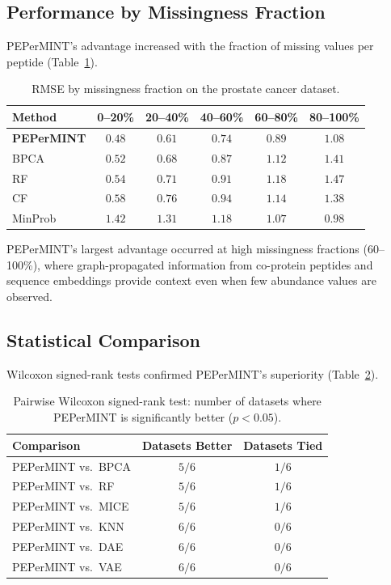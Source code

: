 \documentclass[11pt]{article}
\begin{document}
\subsection{Performance by Missingness Fraction}

PEPerMINT's advantage increased with the fraction of missing values per peptide (Table~\ref{tab:missingness}).

\begin{table}[H]
\centering
\caption{RMSE by missingness fraction on the prostate cancer dataset.}
\label{tab:missingness}
\begin{tabular}{@{}lccccc@{}}
\toprule
Method & 0--20\% & 20--40\% & 40--60\% & 60--80\% & 80--100\% \\
\midrule
\textbf{PEPerMINT} & $\mathbf{0.48}$ & $\mathbf{0.61}$ & $\mathbf{0.74}$ & $\mathbf{0.89}$ & $\mathbf{1.08}$ \\
BPCA & $0.52$ & $0.68$ & $0.87$ & $1.12$ & $1.41$ \\
RF & $0.54$ & $0.71$ & $0.91$ & $1.18$ & $1.47$ \\
CF & $0.58$ & $0.76$ & $0.94$ & $1.14$ & $1.38$ \\
MinProb & $1.42$ & $1.31$ & $1.18$ & $1.07$ & $0.98$ \\
\bottomrule
\end{tabular}
\end{table}

PEPerMINT's largest advantage occurred at high missingness fractions (60--100\%), where graph-propagated information from co-protein peptides and sequence embeddings provide context even when few abundance values are observed.

\subsection{Statistical Comparison}

Wilcoxon signed-rank tests confirmed PEPerMINT's superiority (Table~\ref{tab:wilcoxon}).

\begin{table}[H]
\centering
\caption{Pairwise Wilcoxon signed-rank test: number of datasets where PEPerMINT is significantly better ($p < 0.05$).}
\label{tab:wilcoxon}
\begin{tabular}{@{}lcc@{}}
\toprule
Comparison & Datasets Better & Datasets Tied \\
\midrule
PEPerMINT vs.\ BPCA & $5/6$ & $1/6$ \\
PEPerMINT vs.\ RF & $5/6$ & $1/6$ \\
PEPerMINT vs.\ MICE & $5/6$ & $1/6$ \\
PEPerMINT vs.\ KNN & $6/6$ & $0/6$ \\
PEPerMINT vs.\ DAE & $6/6$ & $0/6$ \\
PEPerMINT vs.\ VAE & $6/6$ & $0/6$ \\
\bottomrule
\end{tabular}
\end{table}
\end{document}
